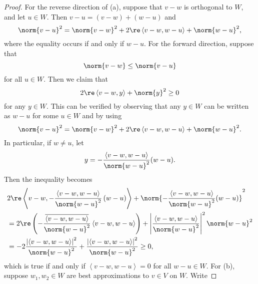 \documentclass[linearalgebra]{subfiles}
\begin{document}
    \begin{proof}
        For the reverse direction of (a), suppose that $v-w$ is orthogonal to $W$, and let $u\in W$. Then $v-u = \left( v-w \right) + \left( w-u \right)$ and
        \begin{equation*}
            \norm{v-u}^2 = \norm{v-w}^2 + 2\re\left\langle v-w, w-u\right\rangle + \norm{w-u}^2,
        \end{equation*}
        where the equality occurs if and only if $w-u$. For the forward direction, suppose that
        \begin{equation*}
            \norm{v-w}\leq \norm{v-u}
        \end{equation*}
        for all $u\in W$. Then we claim that
        \begin{equation*}
            2\re\left\langle v-w, y\right\rangle + \norm{y}^2 \geq 0
        \end{equation*}
        for any $y\in W$. This can be verified by observing that any $y\in W$ can be written as $w-u$ for some $u\in W$ and by using 
        \begin{equation*}
            \norm{v-u}^2 = \norm{v-w}^2 + 2\re\left\langle v-w, w-u\right\rangle + \norm{w-u}^2.
        \end{equation*}
        In particular, if $w\neq u$, let
        \begin{equation*}
            y = - \frac{\left\langle v-w, w-u\right\rangle }{\norm{w-u}^2} (w-u).
        \end{equation*}
        Then the inequality becomes
        \begin{align*}
            & 2\re\left\langle v-w, -\frac{\left\langle v-w, w-u\right\rangle }{\norm{w-u}^2}\left( w-u \right) \right\rangle +  \norm{-\frac{\left\langle v-w, w-u\right\rangle }{\norm{w-u}^2}(w-u)}^2 \\
            & = 2\re\left( -\frac{\overline{\left\langle v-w, w-u\right\rangle }}{\norm{w-u}^2}\left\langle v-w, w-u\right\rangle  \right) + \left| \frac{\left\langle v-w, w-u\right\rangle }{\norm{w-u}^2} \right| ^2 \norm{w-u}^2 \\
            & = -2 \frac{\left| \left\langle v-w, w-u\right\rangle  \right| ^2}{\norm{w-u}^2} + \frac{\left| \left\langle v-w, w-u\right\rangle  \right| ^2}{\norm{w-u}^2} \geq 0,
        \end{align*} 
        which is true if and only if $\left\langle v-w,w-u \right\rangle = 0$ for all $w-u\in W$. For (b), suppose $w_1,w_2\in W$ are best approximations to $v\in V$ on $W$. Write

\end{proof}
\end{document}
